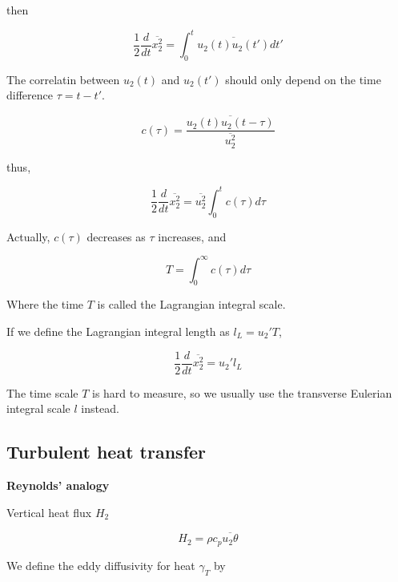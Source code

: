 \documentclass{article}
\begin{document}
then

\begin{equation*}
    \frac{1}{2}\frac{d}{dt}\overline{x_2^2}=\int_0^t\overline{u_2(t)u_2(t')}dt'
\end{equation*}

The correlatin between $u_2(t)$ and $u_2(t')$ should only depend on the time difference $\tau=t-t'$.

\begin{equation*}
    c(\tau)=\frac{\overline{u_2(t)u_2(t-\tau)}}{\overline{u_2^2}}
\end{equation*}

thus,

\begin{equation*}
    \frac{1}{2}\frac{d}{dt}\overline{x_2^2}=\overline{u_2^2}\int_0^t c(\tau)d\tau
\end{equation*}

Actually, $c(\tau)$ decreases as $\tau$ increases, and

\begin{equation*}
    T=\int_0^\infty c(\tau)d\tau
\end{equation*}

Where the time $T$ is called the Lagrangian integral scale.

If we define the Lagrangian integral length as $l_L=u_2'T$,

\begin{equation*}
    \frac{1}{2}\frac{d}{dt}\overline{x_2^2}=u_2' l_L
\end{equation*}

The time scale $T$ is hard to measure, so we usually use the transverse Eulerian integral scale $l$ instead.

\iffalse
\textbf{The gradient-transport fallacy}

\textbf{Further estimates}

\textbf{Recapitulation}
\fi

\subsection{Turbulent heat transfer}

\textbf{Reynolds' analogy}

Vertical heat flux $H_2$

\begin{equation*}
    H_2=\rho c_p \overline{u_2\theta}
\end{equation*}

We define the eddy diffusivity for heat $\gamma_T$ by
\end{document}
